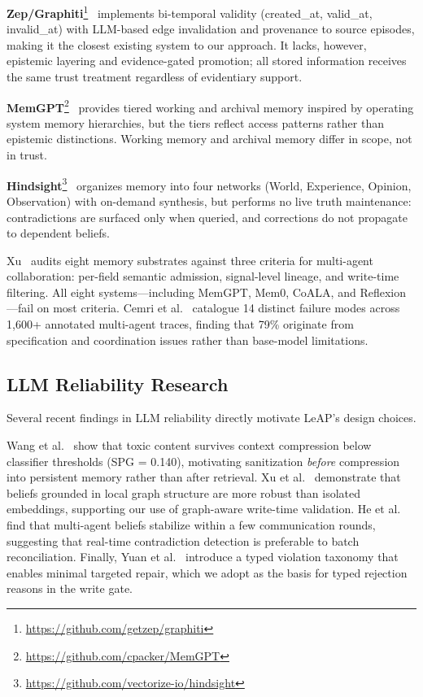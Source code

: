 \documentclass[11pt,letterpaper]{article}
\begin{document}
\textbf{Zep/Graphiti}\footnote{\url{https://github.com/getzep/graphiti}}~\cite{graphiti2025} implements bi-temporal validity (created\_at, valid\_at, invalid\_at) with LLM-based edge invalidation and provenance to source episodes, making it the closest existing system to our approach. It lacks, however, epistemic layering and evidence-gated promotion; all stored information receives the same trust treatment regardless of evidentiary support.

\textbf{MemGPT}\footnote{\url{https://github.com/cpacker/MemGPT}}~\cite{memgpt2023} provides tiered working and archival memory inspired by operating system memory hierarchies, but the tiers reflect access patterns rather than epistemic distinctions. Working memory and archival memory differ in scope, not in trust.

\textbf{Hindsight}\footnote{\url{https://github.com/vectorize-io/hindsight}}~\cite{hindsight} organizes memory into four networks (World, Experience, Opinion, Observation) with on-demand synthesis, but performs no live truth maintenance: contradictions are surfaced only when queried, and corrections do not propagate to dependent beliefs.

Xu~\cite{xu2026mmp} audits eight memory substrates against three criteria for multi-agent collaboration: per-field semantic admission, signal-level lineage, and write-time filtering. All eight systems---including MemGPT, Mem0, CoALA, and Reflexion---fail on most criteria. Cemri et al.~\cite{cemri2025} catalogue 14 distinct failure modes across 1,600+ annotated multi-agent traces, finding that 79\% originate from specification and coordination issues rather than base-model limitations.

\subsection{LLM Reliability Research}

Several recent findings in LLM reliability directly motivate LeAP's design choices.

Wang et al.~\cite{wang2026contamination} show that toxic content survives context compression below classifier thresholds (SPG = 0.140), motivating sanitization \textit{before} compression into persistent memory rather than after retrieval. Xu et al.~\cite{xu2026ncb} demonstrate that beliefs grounded in local graph structure are more robust than isolated embeddings, supporting our use of graph-aware write-time validation. He et al.~\cite{he2026collective} find that multi-agent beliefs stabilize within a few communication rounds, suggesting that real-time contradiction detection is preferable to batch reconciliation. Finally, Yuan et al.~\cite{yuan2026saver} introduce a typed violation taxonomy that enables minimal targeted repair, which we adopt as the basis for typed rejection reasons in the write gate.
\end{document}
